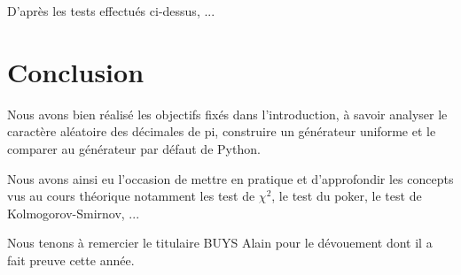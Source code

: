 \documentclass[10pt,a4paper]{article}
\begin{document}
	D'après les tests effectués ci-dessus, ... %
	
	\newpage
	\section{Conclusion}
	Nous avons bien réalisé les objectifs fixés dans l'introduction, à savoir analyser le caractère aléatoire des décimales de pi, construire un générateur uniforme et le comparer au générateur par défaut de Python.
	
	Nous avons ainsi eu l'occasion de mettre en pratique et d'approfondir les concepts vus au cours théorique notamment les test de $\chi^2$, le test du poker, le test de Kolmogorov-Smirnov, ...
	
	Nous tenons à remercier le titulaire BUYS Alain pour le dévouement dont il a fait preuve cette année.
	
\end{document}

